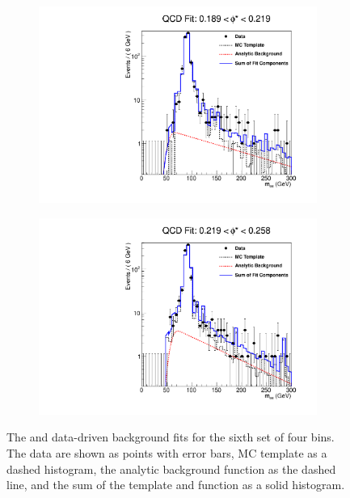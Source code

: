 \begin{figure}[!htbp]
\begin{subfigure}[b]{\SideBySidePlotWidth}
        \includegraphics[width=\linewidth]{figures/qcd_fits/qcd_fit_plot_for_23.pdf}
        \label{fig:qcd_fit_23}
    \end{subfigure}%
    \begin{subfigure}[b]{\SideBySidePlotWidth}
        \includegraphics[width=\linewidth]{figures/qcd_fits/qcd_fit_plot_for_24.pdf}
        \label{fig:qcd_fit_24}
    \end{subfigure}
    \caption[
        The \QCDjets and \wjets data-driven background fits for the sixth set of
        four \phistar bins.
    ]{
        The \QCDjets and \wjets data-driven background fits for the sixth set of
        four \phistar bins. The data are shown as points with error bars, MC
        template as a dashed histogram, the analytic background function as the
        dashed line, and the sum of the template and function as a solid
        histogram.
    }
    \label{fig:qcd_many_6}
\end{figure}

